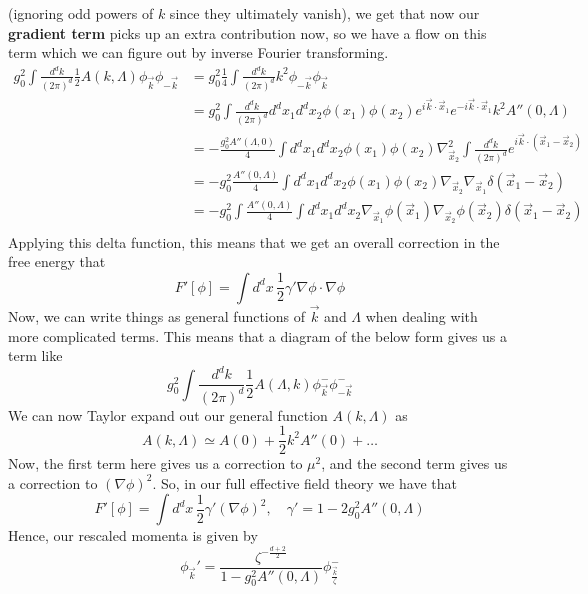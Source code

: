 (ignoring odd powers of $k $ since they ultimately vanish), we get that 
now our \textbf{gradient term } picks up an extra contribution now, 
so we have a flow on this term 
which we can figure out by inverse Fourier transforming. 
\begin{align*}
	g_0 ^ 2 \int \frac{d ^ d k}{ ( 2 \pi ) ^ d } \frac{1}{2 } A ( k , \Lambda ) 
	\phi _{ \vec{k} } \phi _{ - \vec{k} } &=  g_0 ^ 2 \frac{1}{4 } \int 
	\frac{ d ^ d k  }{ ( 2 \pi ) ^ d } k ^ 2 \phi _{ - \vec{k} } \phi _{ \vec{k} } \\
					      &=  g_0 ^ 2 \int \frac{ d ^ d k }{ ( 2 \pi ) ^ d } 
					      d ^ d x_1 d ^ d x_2 \phi ( x_ 1 ) \phi ( x_ 2) 
					      e^{ i \vec{k} \cdot  \vec{x} _ 1 } e ^{ - i \vec{k} \cdot  \vec{x} _ 1 } k ^ 2 A'' ( 0 , \Lambda ) \\
					      &=  - \frac{g_0 ^ 2 A '' ( \Lambda , 0 ) }{ 4 } 
					      \int  d^ d x_1 d ^ d x_2 \phi ( x_1) 
					      \phi ( x_2) \nabla^ 2 _{ \vec{x} _ 2 } \int 
					      \frac{ d ^ d k }{ ( 2 \pi ) ^ d } e ^{ i \vec{k} \cdot  ( \vec{x} _ 1 - \vec{x} _ 2 ) }\\
					      &=  - g_0^ 2 \frac{ A '' ( 0 , \Lambda ) }{ 4 }
					      \int d ^ d x_1 d ^ d x_2 \phi ( x_1 ) 
					      \phi ( x_2 ) \nabla _{ \vec{x} _ 2 } \nabla _{ \vec{x} _ 1 } \delta ( 
					      \vec{x} _ 1- \vec{x} _ 2 ) \\
					      &= - g_0 ^ 2 \int \frac{ A'' ( 0, \Lambda ) }{ 4 } 
					      \int d ^ d x_1 d ^d x_2 \nabla_{ \vec{x} _ 1 } \phi ( \vec{x} _ 1 ) \nabla _{ \vec{x} _ 2 } \phi( { \vec{x} _ 2 }) \delta ( \vec{x} _ 1 - \vec{x} _ 2 )  \\
\end{align*}
Applying this delta function, this means that we get an overall correction in 
the free energy that 
\[
 F ' [ \phi ] = \int d ^ d x \, \frac{1}{2 } \gamma ' \nabla \phi \cdot  \nabla  \phi 
\] 
Now, we can write things as general functions of $ \vec{k}  $ and $\Lambda $
when dealing with more complicated terms. 
This means that a diagram of the below form gives us a term like 
\[
	g_0 ^ 2 \int \frac{ d ^ d k }{ ( 2 \pi ) ^ d } \frac{1}{2 } A( \Lambda , k) \phi_{\vec{k} } ^ - 
	\phi _{  - \vec{k} } ^ -  
\] We can now Taylor expand out our general function 
$ A ( k, \Lambda ) $ as 
 \[
	 A ( k , \Lambda ) \simeq A ( 0 ) + \frac{1}{2 } k ^ 2 A'' ( 0 ) + \dots
\] Now, the first term here
gives us a correction to $\mu ^ 2  $, and the second term 
gives us a correction to $ ( \nabla \phi ) ^ 2 $. 
So, in our full effective field theory we have that 
\[
 F ' [ \phi ] = \int d^ d x \, \frac{1}{2 } \gamma ' ( \nabla \phi ) ^ 2, 
 \quad \gamma ' =  1- 2 g_0 ^ 2 A'' ( 0 , \Lambda ) 
\] Hence, our rescaled momenta is given by 
\[
 \phi_{ \vec{k} } ' = \frac{ \zeta ^{  - \frac{ d + 2 }{ 2 } } }{1 - g_0 ^ 2 A'' ( 0 
 , \Lambda ) } \phi_{ \frac{ \vec{k} }{ \zeta } } ^ - 
\]
